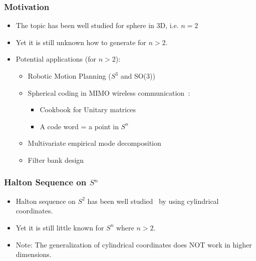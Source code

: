 \documentclass[serif]{beamer} %
\begin{document}

\begin{frame}[fragile]
\frametitle{Motivation}
\begin{itemize}
  \item The topic has been well studied for sphere in 3D, i.e. $n=2$
  \item Yet it is still unknown how to generate for $n > 2$.
  \item Potential applications (for $n > 2$):
  \begin{itemize}
    \item Robotic Motion Planning ($S^3$ and SO(3))~\cite{yershova2010generating}
    \item Spherical coding in MIMO wireless communication~\cite{utkovski2006construction}:
    \begin{itemize}
      \item Cookbook for Unitary matrices
      \item A code word = a point in $S^n$
    \end{itemize}
    \item Multivariate empirical mode decomposition~\cite{rehman2010multivariate}
    \item Filter bank design~\cite{mandic2011filter}
  \end{itemize}
\end{itemize}
\end{frame}


\begin{frame}[fragile]
\frametitle{Halton Sequence on $S^n$}
\begin{itemize}
  \item Halton sequence on $S^2$ has been well studied~\cite{cui1997equidistribution} by using cylindrical coordinates.
  \item Yet it is still little known for $S^n$ where $n>2$.
  \item
\begin{alert}{Note:}
The generalization of cylindrical coordinates does NOT work in higher dimensions.
\end{alert}

\end{itemize}
\end{frame}
\end{document}

